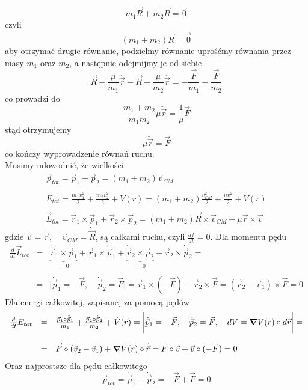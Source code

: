 \documentclass[a4paper,12pt]{article}
\begin{document}
		$$
			m_1\ddot{\vec{R}} + m_2\ddot{\vec{R}} = \vec{0}
		$$
	czyli
		$$
			(m_1+m_2)\ddot{\vec{R}} = \vec{0}
		$$
	aby otrzymać drugie równanie, podzielmy równanie uprośćmy równania przez masy $m_1$ oraz $m_2$, a następnie odejmijmy je od siebie
		$$
			\ddot{\vec{R}} - \frac{\mu}{m_1}\ddot{\vec{r}} - \ddot{\vec{R}} - \frac{\mu}{m_2}\ddot{\vec{r}} = -\frac{\vec{F}}{m_1} - \frac{\vec{F}}{m_2}
		$$
	co prowadzi do
		$$
		\frac{m_1+m_2}{m_1 m_2}\mu \ddot{\vec{r}} = \frac{1}{\mu} \vec{F}
		$$
	stąd otrzymujemy
		$$
		\mu\ddot{\vec{r}} = \vec{F}
		$$
	co kończy wyprowadzenie równań ruchu.\\
	Musimy udowodnić, że wielkości
		$$
		\begin{array}{l}
			\vec{p}_{tot} = \vec{p}_1+\vec{p}_2=(m_1+m_2)\vec{v}_{CM}\\\\
			E_{tot} = \frac{m_1 v_1^2}{2}+\frac{m_2 v_2^2}{2} + V(r) = (m_1+m_2)\frac{v_{CM}^2}{2}+\frac{\mu v^2}{2} + V(r)\\\\
			\vec{L}_{tot} = \vec{r}_1\times\vec{p}_1 + \vec{r}_2\times\vec{p}_2 =  (m_1+m_2)\vec{R}\times\vec{v}_{CM}+\mu\vec{r}\times\vec{v}
		\end{array}
		$$
	gdzie $\vec{v}=\dot{\vec{r}},\quad \vec{v}_{CM} = \dot{\vec{R}}$, są
	całkami ruchu, czyli $\frac{d f}{dt}=0$. Dla momentu pędu
	$$
	\begin{array}{lll}
		\frac{d}{dt}\vec{L}_{tot} &=& \underbrace{\dot{\vec{r}}_1 \times\vec{p}_1}_{=0} + \vec{r}_1\times\dot{\vec{p}}_1 + \underbrace{\dot{\vec{r}}_2 \times\vec{p}_2}_{=0} + \vec{r}_2\times\dot{\vec{p}}_2 = \\\\
		&=&\bigg\vert \dot{\vec{p}}_1 = -\vec{F}, \quad \dot{\vec{p}}_2 = \vec{F} \bigg\vert = \vec{r}_1\times(-\vec{F})+\vec{r}_2\times\vec{F} = (\vec{r}_2-\vec{r}_1)\times \vec{F} = 0
	\end{array}
	$$
	Dla energi całkowitej, zapisanej za pomocą pędów 
	$$
	\begin{array}{lll}
		\frac{d}{dt}E_{tot} & = & \frac{\vec{p}_1\circ\ddot{\vec{p}}_1}{m_1} + \frac{\vec{p}_2\circ\ddot{\vec{p}}_2}{m_2} + \dot{V}(r) =
		\bigg\vert \dot{\vec{p}}_1 = -\vec{F}, \quad \dot{\vec{p}}_2 = \vec{F},\quad dV = \grad{V(r)}\circ d\vec{r} \bigg\vert =\\\\
		&=& \vec{F}\circ(\vec{v}_2-\vec{v}_1) + \grad{V(r)}\circ\dot{\vec{r}} = \vec{F}\circ \vec{v} + \vec{v}\circ(-\vec{F}) = 0
	\end{array}
	$$
	Oraz najprostsze dla pędu całkowitego
	$$
	\dot{\vec{p}}_{tot} = \dot{\vec{p}}_1 + \dot{\vec{p}}_2 = -\vec{F}+\vec{F} = 0
	$$
\end{document}
